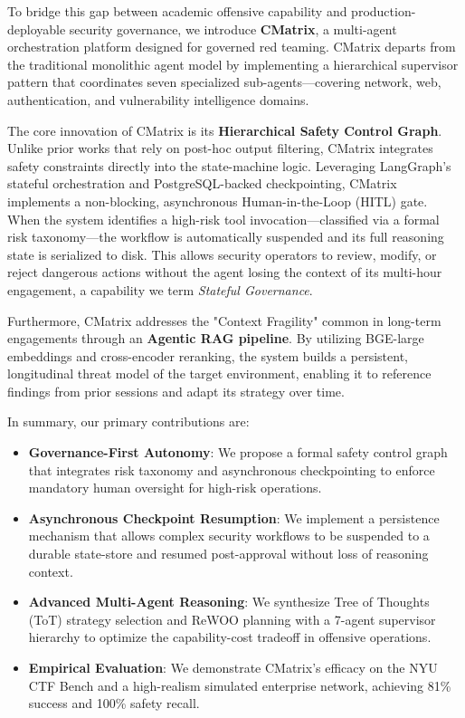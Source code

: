 To bridge this gap between academic offensive capability and production-deployable security governance, we introduce \textbf{CMatrix}, a multi-agent orchestration platform designed for governed red teaming. CMatrix departs from the traditional monolithic agent model by implementing a hierarchical supervisor pattern that coordinates seven specialized sub-agents—covering network, web, authentication, and vulnerability intelligence domains.

The core innovation of CMatrix is its \textbf{Hierarchical Safety Control Graph}. Unlike prior works that rely on post-hoc output filtering, CMatrix integrates safety constraints directly into the state-machine logic. Leveraging LangGraph's stateful orchestration and PostgreSQL-backed checkpointing, CMatrix implements a non-blocking, asynchronous Human-in-the-Loop (HITL) gate. When the system identifies a high-risk tool invocation—classified via a formal risk taxonomy—the workflow is automatically suspended and its full reasoning state is serialized to disk. This allows security operators to review, modify, or reject dangerous actions without the agent losing the context of its multi-hour engagement, a capability we term \textit{Stateful Governance}.

Furthermore, CMatrix addresses the "Context Fragility" common in long-term engagements through an \textbf{Agentic RAG pipeline}. By utilizing BGE-large embeddings and cross-encoder reranking, the system builds a persistent, longitudinal threat model of the target environment, enabling it to reference findings from prior sessions and adapt its strategy over time.

In summary, our primary contributions are:
\begin{itemize}
    \item \textbf{Governance-First Autonomy}: We propose a formal safety control graph that integrates risk taxonomy and asynchronous checkpointing to enforce mandatory human oversight for high-risk operations.
    \item \textbf{Asynchronous Checkpoint Resumption}: We implement a persistence mechanism that allows complex security workflows to be suspended to a durable state-store and resumed post-approval without loss of reasoning context.
    \item \textbf{Advanced Multi-Agent Reasoning}: We synthesize Tree of Thoughts (ToT) strategy selection and ReWOO planning with a 7-agent supervisor hierarchy to optimize the capability-cost tradeoff in offensive operations.
    \item \textbf{Empirical Evaluation}: We demonstrate CMatrix's efficacy on the NYU CTF Bench and a high-realism simulated enterprise network, achieving 81\% success and 100\% safety recall.
\end{itemize}
